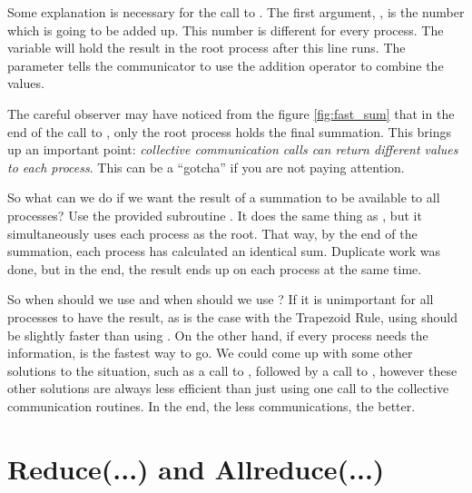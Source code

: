   

  Some explanation is necessary for the call to . The first argument, , is the number which is going to be added up. This number is different for every process. The variable  will hold the result in the root process after this line runs. The parameter  tells the communicator to use the addition operator to combine the values.

  The careful observer may have noticed from the figure \ref{fig:fast_sum} that in the end of the call to , only the root process holds the final summation. This brings up an important point: \emph{collective communication calls can return different values to each process}. This can be a ``gotcha'' if you are not paying attention.

  So what can we do if we want the result of a summation to be available to all processes? Use the provided subroutine . It does the same thing as , but it simultaneously uses each process as the root. That way, by the end of the summation, each process has calculated an identical sum. Duplicate work was done, but in the end, the result ends up on each process at the same time.

  So when should we use  and when should we use ? If it is unimportant for all processes to have the result, as is the case with the Trapezoid Rule, using  should be slightly faster than using . On the other hand, if every process needs the information,  is the fastest way to go. We could come up with some other solutions to the situation, such as a call to , followed by a call to , however these other solutions are always less efficient than just using one call to the collective communication routines. In the end, the less communications, the better.



\section*{Reduce(...) and Allreduce(...)}

